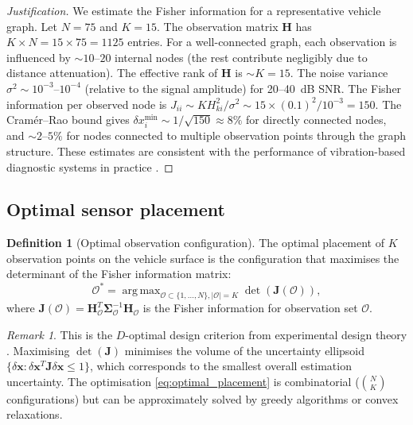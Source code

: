 \documentclass[twocolumn,10pt,a4paper]{article}
\theoremstyle{definition}
\newtheorem{definition}[theorem]{Definition}
\theoremstyle{remark}
\newtheorem{remark}[theorem]{Remark}
\newcommand{\vect}[1]{\boldsymbol{#1}}
\newcommand{\mat}[1]{\mathbf{#1}}
\DeclareMathOperator*{\argmax}{arg\,max}
\begin{document}
\begin{proof}[Justification]
We estimate the Fisher information for a representative vehicle graph. Let $N = 75$ and $K = 15$. The observation matrix $\mat{H}$ has $K \times N = 15 \times 75 = 1125$ entries. For a well-connected graph, each observation is influenced by $\sim 10$--$20$ internal nodes (the rest contribute negligibly due to distance attenuation). The effective rank of $\mat{H}$ is $\sim K = 15$. The noise variance $\sigma^2 \sim 10^{-3}$--$10^{-4}$ (relative to the signal amplitude) for 20--40~dB SNR. The Fisher information per observed node is $J_{ii} \sim K H_{ki}^2 / \sigma^2 \sim 15 \times (0.1)^2 / 10^{-3} = 150$. The Cram\'{e}r--Rao bound gives $\delta x_i^{\min} \sim 1/\sqrt{150} \approx 8\%$ for directly connected nodes, and $\sim 2$--$5\%$ for nodes connected to multiple observation points through the graph structure. These estimates are consistent with the performance of vibration-based diagnostic systems in practice \citep{Jardine2006, Randall2011}.
\end{proof}

\subsection{Optimal sensor placement}

\begin{definition}[Optimal observation configuration]\label{def:optimal_sensors}
The optimal placement of $K$ observation points on the vehicle surface is the configuration that maximises the determinant of the Fisher information matrix:
\begin{equation}\label{eq:optimal_placement}
\mathcal{O}^* = \argmax_{\mathcal{O} \subset \{1,\ldots,N\}, |\mathcal{O}|=K} \det(\mat{J}(\mathcal{O})),
\end{equation}
where $\mat{J}(\mathcal{O}) = \mat{H}_{\mathcal{O}}^T \mat{\Sigma}_{\mathcal{O}}^{-1} \mat{H}_{\mathcal{O}}$ is the Fisher information for observation set $\mathcal{O}$.
\end{definition}

\begin{remark}
This is the $D$-optimal design criterion from experimental design theory \citep{Kay1993}. Maximising $\det(\mat{J})$ minimises the volume of the uncertainty ellipsoid $\{\delta\vect{x} : \delta\vect{x}^T \mat{J} \delta\vect{x} \leq 1\}$, which corresponds to the smallest overall estimation uncertainty. The optimisation \eqref{eq:optimal_placement} is combinatorial ($\binom{N}{K}$ configurations) but can be approximately solved by greedy algorithms or convex relaxations.
\end{remark}
\end{document}
